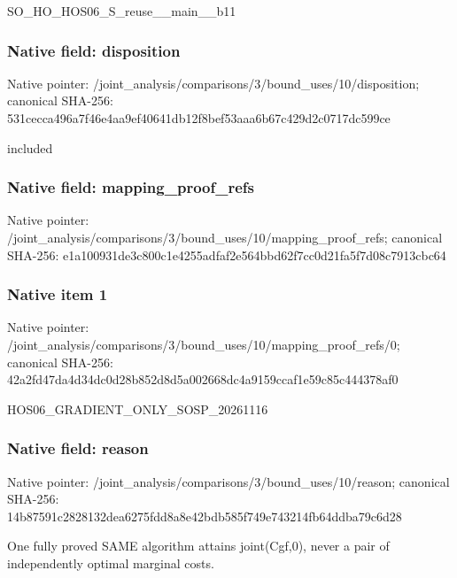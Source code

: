\documentclass[10pt,a4paper]{article}
\begin{document}
\begingroup\raggedright\sloppy SO\_\allowbreak{}HO\_\allowbreak{}HOS06\_\allowbreak{}S\_\allowbreak{}reuse\_\allowbreak{}\_\allowbreak{}main\_\allowbreak{}\_\allowbreak{}b11\par\endgroup

\subsubsection{Native field: disposition}
Native pointer: /joint\_\allowbreak{}analysis/comparisons/3/bound\_\allowbreak{}uses/10/disposition; canonical SHA-256: 531cecca496a7f46e4aa9ef40641db12f8bef53aaa6b67c429d2c0717dc599ce

\begingroup\raggedright\sloppy included\par\endgroup

\subsubsection{Native field: mapping\_\allowbreak{}proof\_\allowbreak{}refs}
Native pointer: /joint\_\allowbreak{}analysis/comparisons/3/bound\_\allowbreak{}uses/10/mapping\_\allowbreak{}proof\_\allowbreak{}refs; canonical SHA-256: e1a100931de3c800c1e4255adfaf2e564bbd62f7cc0d21fa5f7d08c7913cbc64

\subsubsection{Native item 1}
Native pointer: /joint\_\allowbreak{}analysis/comparisons/3/bound\_\allowbreak{}uses/10/mapping\_\allowbreak{}proof\_\allowbreak{}refs/0; canonical SHA-256: 42a2fd47da4d34dc0d28b852d8d5a002668dc4a9159ccaf1e59c85c444378af0

\begingroup\raggedright\sloppy HOS06\_\allowbreak{}GRADIENT\_\allowbreak{}ONLY\_\allowbreak{}SOSP\_\allowbreak{}20261116\par\endgroup

\subsubsection{Native field: reason}
Native pointer: /joint\_\allowbreak{}analysis/comparisons/3/bound\_\allowbreak{}uses/10/reason; canonical SHA-256: 14b87591c2828132dea6275fdd8a8e42bdb585f749e743214fb64ddba79c6d28

\begingroup\raggedright\sloppy One fully proved SAME algorithm attains joint(Cgf,\allowbreak{}0),\allowbreak{} never a pair of independently optimal marginal costs.\par\endgroup
\end{document}
